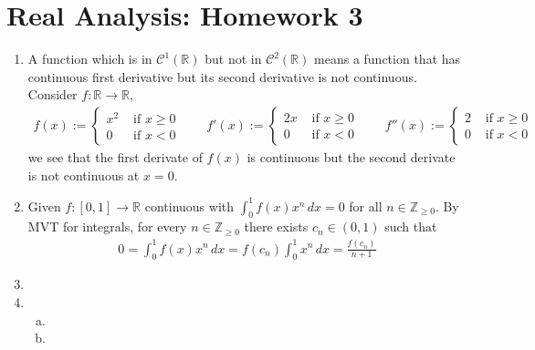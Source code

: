 \documentclass[a4paper,12pt]{article}
\theoremstyle{definition}
\begin{document}
\section*{Real Analysis: Homework 3}

\begin{enumerate}
\item
A function which is in $\mathcal{C}^1(\mathbb{R})$ but not in $\mathcal{C}^2(\mathbb{R})$ means a function that has continuous first derivative but its second derivative is not continuous. Consider $f: \mathbb{R} \to \mathbb{R}$,
\begin{align*}
f(x):=\begin{cases}
x^2 & \text{ if }x \geq 0\\
0 & \text{ if }x <0
\end{cases}\qquad
f'(x):=\begin{cases}
2x & \text{ if }x \geq 0\\
0 & \text{ if }x <0
\end{cases}\qquad
f''(x):=\begin{cases}
2 & \text{ if }x \geq 0\\
0 & \text{ if }x <0
\end{cases}
\end{align*}
we see that the first derivate of $f(x)$ is continuous but the second derivate is not continuous at $x =0$.



\item
Given $f:[0,1] \to \mathbb{R}$ continuous with $\int_{0}^{1}f(x)x^n\,dx=0$ for all $n \in \mathbb{Z}_{\geq 0}$. By MVT for integrals, for every $n \in \mathbb{Z}_{\geq 0}$ there exists $c_n \in (0,1)$ such that
\begin{align*}
0 = \int_{0}^{1}f(x)x^n\,dx = f(c_n) \int_{0}^{1}x^n\,dx = \frac{f(c_n)}{n+1}
\end{align*}



\item




\item
\begin{enumerate}[(a)]
\item

\item
\end{enumerate}


\end{enumerate}
\end{document}
